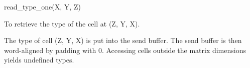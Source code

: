 

\format
read\_type\_one(X, Y, Z)

\purpose

To retrieve the type of the cell at (Z, Y, X).

\description

The type of cell (Z, Y, X) is put into the send buffer.
The send buffer is then word-aligned by padding with 0.
Accessing cells outside the matrix dimensions yields undefined types.
